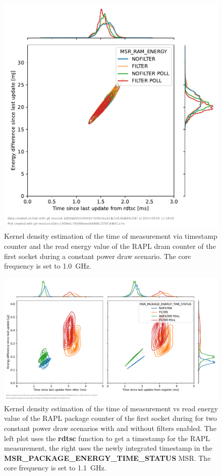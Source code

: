\begin{figure}[]
    \centering
    \includegraphics[width=0.54\columnwidth]{fig/rapl-update-intervals/MSR_RAM_ENERGY_1000000.pdf}
    \caption{Kernel density estimation of the time of measurement via timestamp counter and the read energy value of the RAPL dram counter of the first socket during a constant power draw scenario.
    The core frequency is set to \SI{1.0}{\GHz}.}
\end{figure}

\clearpage
\begin{figure}[]
    \centering
    \includegraphics[width=\columnwidth]{fig/rapl-update-intervals/MSR_PACKAGE_ENERGY_TIME_STATUS_1100000.pdf}
    \caption{Kernel density estimation of the time of measurement vs read energy value of the RAPL package counter of the first socket during for two constant power draw scenarios with and without filters enabled.
    The left plot uses the \textbf{rdtsc} function to get a timestamp for the RAPL measurement, the right uses the newly integrated timestamp in the \textbf{MSR\_PACKAGE\_ENERGY\_TIME\_STATUS} MSR.
    The core frequency is set to \SI{1.1}{\GHz}.}
\end{figure}

